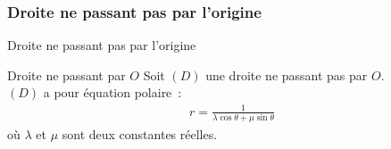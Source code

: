 \documentclass[14pt]{beamer}
\begin{document}
\subsubsection{Droite ne passant pas par l'origine}
\begin{frame}{Droite ne passant pas par l'origine}
        \begin{alertblock}{Droite ne passant par $O$}
                Soit $(D)$ une droite ne passant pas par $O$.\\
                $(D)$ a pour équation polaire~:
                \begin{align*}
                        r=\frac{1}{\lambda\cos\theta+\mu\sin\theta}
                \end{align*}
                où $\lambda$ et $\mu$ sont deux constantes réelles.
        \end{alertblock}
\end{frame}
\end{document}
